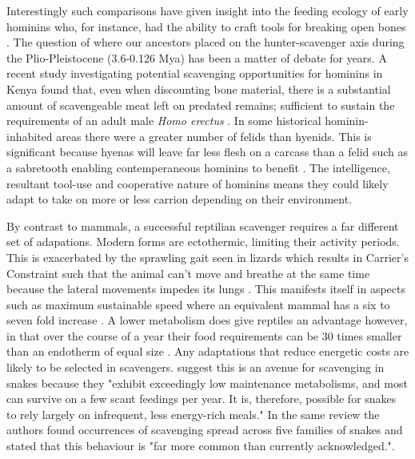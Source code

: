 \documentclass[a4paper,12pt]{article}
\begin{document}
Interestingly such comparisons have given insight into the feeding ecology of early hominins who, for instance, had the ability to craft tools for breaking open bones \citep{hone2010feeding,ARCM:ARCM12084}. The question of where our ancestors placed on the hunter-scavenger axis during the Plio-Pleistocene (3.6-0.126 Mya) has been a matter of debate for years. A recent study investigating potential scavenging opportunities for hominins in Kenya found that, even when discounting bone material, there is a substantial amount of scavengeable meat left on predated remains; sufficient to sustain the requirements of an adult male \textit{Homo erectus} \citep{pobiner2015new}. In some historical hominin-inhabited areas there were a greater number of felids than hyenids. This is significant because hyenas will %
 leave far less flesh on a carcass than a felid such as a sabretooth enabling contemperaneous hominins to benefit \citep{pobiner2015new}. The intelligence,%
 resultant tool-use and cooperative nature of hominins means they could likely adapt to take on more or less carrion depending on their environment.

By contrast to mammals, a successful reptilian scavenger requires a far different set of adapations. Modern forms are ectothermic, limiting their activity periods. This is exacerbated by the sprawling gait seen in lizards which results in Carrier's Constraint such that the animal can't move and breathe at the same time because the lateral movements impedes its lungs \citep{carrier1987evolution}. This manifests itself in aspects such as maximum sustainable speed where an equivalent mammal has a six to seven fold increase \citep{ruben1995evolution}. A lower metabolism does give reptiles an advantage however, in that over the course of a year their food requirements can be 30 times smaller than an endotherm of equal size \citep{Nagy1621}. Any adaptations that reduce energetic costs are likely to be selected in scavengers. \cite{devault2002scavenging} suggest this is an avenue for scavenging in snakes because they "exhibit exceedingly low maintenance metabolisms, and most can survive on a few scant feedings per year. It is, therefore, possible for snakes to rely largely on infrequent, less energy-rich meals." In the same review the authors found occurrences of scavenging spread across five families of snakes and stated that this behaviour is "far more common than currently acknowledged."\citep{devault2002scavenging}. 
\end{document}
